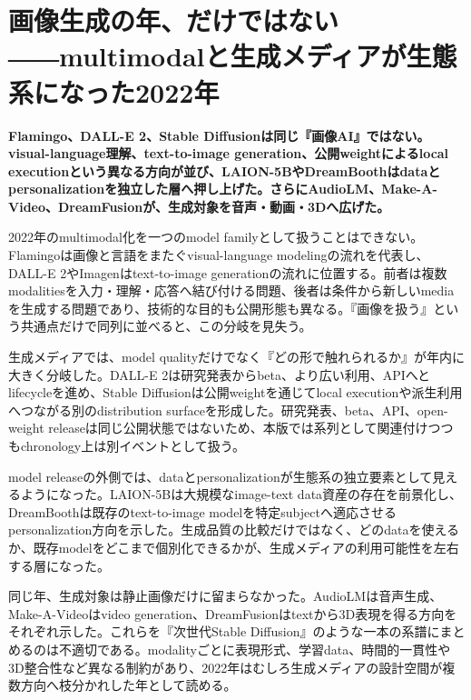 \section{画像生成の年、だけではない――multimodalと生成メディアが生態系になった2022年}
\noindent\textbf{Flamingo、DALL-E 2、Stable Diffusionは同じ『画像AI』ではない。visual-language理解、text-to-image generation、公開weightによるlocal executionという異なる方向が並び、LAION-5BやDreamBoothはdataとpersonalizationを独立した層へ押し上げた。さらにAudioLM、Make-A-Video、DreamFusionが、生成対象を音声・動画・3Dへ広げた。}\autocite{src-13aed13ff36c,src-16a1a1dc486e,src-26aadbc0393f,src-27297a80fac0,src-2832ee43ab8f,src-2c38d2f354fa,src-86ce6205a4ed,src-929080260e16,src-c5c7eddb6cf6,src-e0a494dc6724}

2022年のmultimodal化を一つのmodel familyとして扱うことはできない。Flamingoは画像と言語をまたぐvisual-language modelingの流れを代表し、DALL-E 2やImagenはtext-to-image generationの流れに位置する。前者は複数modalitiesを入力・理解・応答へ結び付ける問題、後者は条件から新しいmediaを生成する問題であり、技術的な目的も公開形態も異なる。『画像を扱う』という共通点だけで同列に並べると、この分岐を見失う。\autocite{src-13aed13ff36c,src-16a1a1dc486e,src-27297a80fac0,src-2c38d2f354fa,src-86ce6205a4ed,src-929080260e16,src-c5c7eddb6cf6,src-cf669aed6653}


生成メディアでは、model qualityだけでなく『どの形で触れられるか』が年内に大きく分岐した。DALL-E 2は研究発表からbeta、より広い利用、APIへとlifecycleを進め、Stable Diffusionは公開weightを通じてlocal executionや派生利用へつながる別のdistribution surfaceを形成した。研究発表、beta、API、open-weight releaseは同じ公開状態ではないため、本版では系列として関連付けつつもchronology上は別イベントとして扱う。\autocite{src-16a1a1dc486e,src-26aadbc0393f,src-27297a80fac0,src-2832ee43ab8f,src-2c38d2f354fa,src-86ce6205a4ed,src-929080260e16}


model releaseの外側では、dataとpersonalizationが生態系の独立要素として見えるようになった。LAION-5Bは大規模なimage-text data資産の存在を前景化し、DreamBoothは既存のtext-to-image modelを特定subjectへ適応させるpersonalization方向を示した。生成品質の比較だけではなく、どのdataを使えるか、既存modelをどこまで個別化できるかが、生成メディアの利用可能性を左右する層になった。\autocite{src-26aadbc0393f,src-2832ee43ab8f,src-76875f66d5f3,src-e0a494dc6724}


同じ年、生成対象は静止画像だけに留まらなかった。AudioLMは音声生成、Make-A-Videoはvideo generation、DreamFusionはtextから3D表現を得る方向をそれぞれ示した。これらを『次世代Stable Diffusion』のような一本の系譜にまとめるのは不適切である。modalityごとに表現形式、学習data、時間的一貫性や3D整合性など異なる制約があり、2022年はむしろ生成メディアの設計空間が複数方向へ枝分かれした年として読める。\autocite{src-1b692f6d18b5,src-b2dbb3098853,src-c19139f0be76}


